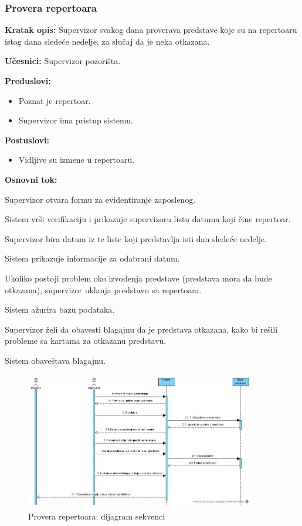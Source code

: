 \documentclass[a4paper]{article}
\begin{document}
\subsubsection{Provera repertoara} 
\noindent\textbf{Kratak opis:} Supervizor svakog dana proverava predstave koje su na repertoaru istog dana sledeće nedelje, za slučaj da je neka otkazana.

\noindent\textbf{Učesnici:} Supervizor pozorišta.

\noindent\textbf{Preduslovi:}
  \begin{itemize}
    \item Poznat je repertoar.
    \item Supervizor ima pristup sistemu.
  \end{itemize}

\noindent\textbf{Postuslovi:} 
  \begin{itemize}
    \item Vidljive su izmene u repertoaru.
  \end{itemize}

\noindent\textbf{Osnovni tok:}
  \begin{legal}
    \item Supervizor otvara formu za evidentiranje zaposlenog.
    \item Sistem vrši verifikaciju i prikazuje supervizoru listu datuma koji čine repertoar.
    \item Supervizor bira datum iz te liste koji predstavlja isti dan sledeće nedelje.
    \item Sistem prikazuje informacije za odabrani datum.
    \item Ukoliko postoji problem oko izvođenja predstave (predstava mora da bude otkazana), supervizor uklanja predstavu sa repertoara.
    \item Sistem ažurira bazu podataka.
    \item Supervizor želi da obavesti blagajnu da je predstava otkazana, kako bi rešili probleme sa kartama za otkazanu predstavu.
    \item Sistem obaveštava blagajnu.
  \end{legal}

\begin{figure}[H]
  \begin{center}
      \includegraphics[width=100mm,height=60mm]{../images/sequence_provera_repertoara.jpg}
  \end{center}
  \caption{Provera repertoara: dijagram sekvenci}
  \label{sequence_provera_repertoara}
\end{figure}
\end{document}
